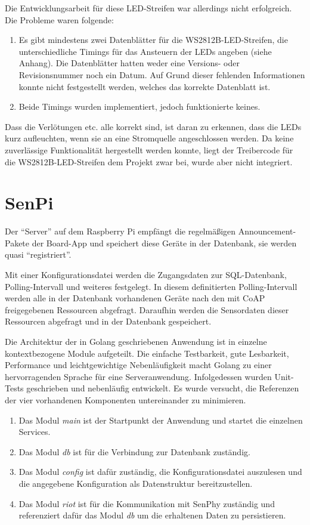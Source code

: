 \documentclass[a4paper]{article}
\begin{document}
Die Entwicklungsarbeit für diese LED-Streifen war allerdings nicht erfolgreich. Die Probleme waren folgende:
\begin{enumerate}
	\item Es gibt mindestens zwei Datenblätter für die WS2812B-LED-Streifen, die unterschiedliche Timings für das  Ansteuern der LEDs angeben (siehe Anhang). Die Datenblätter hatten weder eine Versions- oder Revisionsnummer noch ein Datum. Auf Grund dieser fehlenden Informationen konnte nicht festgestellt werden, welches das korrekte Datenblatt ist. 
    \item Beide Timings wurden implementiert, jedoch funktionierte keines.
\end{enumerate}
Dass die Verlötungen etc. alle korrekt sind, ist daran zu erkennen, dass die LEDs kurz aufleuchten, wenn sie an eine Stromquelle angeschlossen werden. Da keine zuverlässige Funktionalität hergestellt werden konnte, liegt der Treibercode für die WS2812B-LED-Streifen dem Projekt zwar bei, wurde aber nicht integriert. 

\section{SenPi}
Der \enquote{Server} auf dem Raspberry Pi empfängt die regelmäßigen Announcement-Pakete der Board-App und speichert diese Geräte in der Datenbank, sie werden quasi \enquote{registriert}.

Mit einer Konfigurationsdatei werden die Zugangsdaten zur SQL-Datenbank, Polling-Intervall und weiteres festgelegt. In diesem definitierten Polling-Intervall werden alle in der Datenbank vorhandenen Geräte nach den mit CoAP freigegebenen Ressourcen abgefragt. Daraufhin werden die Sensordaten dieser Ressourcen abgefragt und in der Datenbank gespeichert.

Die Architektur der in Golang geschriebenen Anwendung ist in einzelne kontextbezogene Module aufgeteilt. Die einfache Testbarkeit, gute Lesbarkeit, Performance und leichtgewichtige Nebenläufigkeit macht Golang zu einer hervorragenden Sprache für eine Serveranwendung. Infolgedessen wurden Unit-Tests geschrieben und nebenläufig entwickelt. Es wurde versucht, die Referenzen der vier vorhandenen Komponenten untereinander zu minimieren.
\begin{enumerate}
\item Das Modul \emph{main} ist der Startpunkt der Anwendung und startet die einzelnen Services. 
\item Das Modul \emph{db} ist für die Verbindung zur Datenbank zuständig. 
\item Das Modul \emph{config} ist dafür zuständig, die Konfigurationsdatei auszulesen und die angegebene Konfiguration als Datenstruktur bereitzustellen.
\item Das Modul \emph{riot} ist für die Kommunikation mit SenPhy zuständig und referenziert dafür das Modul \emph{db} um die erhaltenen Daten zu persistieren.
\end{enumerate}
\end{document}
